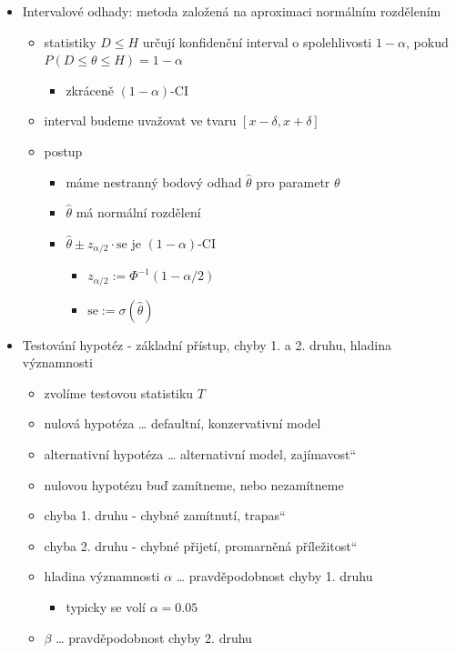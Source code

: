 \begin{itemize}
\item Intervalové odhady: metoda založená na aproximaci normálním rozdělením
\begin{itemize}
\item statistiky $D\leq H$ určují konfidenční interval o spolehlivosti $1-\alpha$, pokud $P(D\leq\theta\leq H)=1-\alpha$
\begin{itemize}
\item zkráceně $(1-\alpha)$-CI
\end{itemize}
\item interval budeme uvažovat ve tvaru $[x-\delta,x+\delta]$
\item postup
\begin{itemize}
\item máme nestranný bodový odhad $\hat\theta$ pro parametr $\theta$
\item $\hat\theta$ má normální rozdělení
\item $\hat\theta\pm z_{\alpha/2}\cdot\text{se}$ je $(1-\alpha)$-CI
\begin{itemize}
\item $z_{\alpha/2}:=\Phi^{-1}(1-\alpha/2)$
\item $\text{se}:=\sigma(\hat\theta)$
\end{itemize}
\end{itemize}
\end{itemize}
\item Testování hypotéz - základní přístup, chyby 1. a 2. druhu, hladina významnosti
\begin{itemize}
\item zvolíme testovou statistiku $T$
\item nulová hypotéza \dots{} defaultní, konzervativní model
\item alternativní hypotéza \dots{} alternativní model, \quotedblbase{}zajímavost\textquotedblleft{}
\item nulovou hypotézu buď zamítneme, nebo nezamítneme
\item chyba 1. druhu - chybné zamítnutí, \quotedblbase{}trapas\textquotedblleft{}
\item chyba 2. druhu - chybné přijetí, \quotedblbase{}promarněná příležitost\textquotedblleft{}
\item hladina významnosti $\alpha$ \dots{} pravděpodobnost chyby 1. druhu
\begin{itemize}
\item typicky se volí $\alpha=0.05$
\end{itemize}
\item $\beta$ \dots{} pravděpodobnost chyby 2. druhu

\end{itemize}
\end{itemize}

